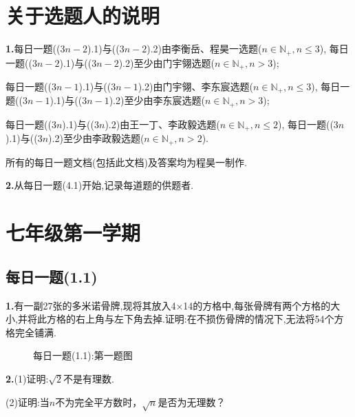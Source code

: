 \documentclass{article}
\title{\vspace*{-1em}{\huge\textbf{每日一题合集}}}
\author{\kaishu李衡岳、\textbf{程昊一}、门宇翎、李东宸、王一丁、李政毅}
\date{}
\begin{document}
\maketitle

{\centering\tableofcontents}
\newpage\section{关于选题人的说明}
\textbf{1.}每日一题(($3n-2$).1)与(($3n-2$).2)由李衡岳、程昊一选题($n\in\mathbb{N}_+, n\le3$), 每日一题(($3n-2$).1)与(($3n-2$).2)至少由门宇翎选题($n\in\mathbb{N}_+, n>3$);
\par\hspace*{1em}每日一题(($3n-1$).1)与(($3n-1$).2)由门宇翎、李东宸选题($n\in\mathbb{N}_+, n\le3$), 每日一题(($3n-1$).1)与(($3n-1$).2)至少由李东宸选题($n\in\mathbb{N}_+, n>3$);
\par\hspace*{1em}每日一题(($3n$).1)与(($3n$).2)由王一丁、李政毅选题($n\in\mathbb{N_+}, n\le 2$), 每日一题(($3n$).1)与(($3n$).2)至少由李政毅选题($n\in\mathbb{N_+}, n>2$).
\par\hspace*{1em}所有的每日一题文档(包括此文档)及答案均为程昊一制作.\\
\par\textbf{2.}从每日一题(4.1)开始,记录每道题的供题者.
\newpage\section{七年级第一学期}

{\centering\subsection*{每日一题(1.1)}}
\par\textbf{1.}有一副27张的多米诺骨牌,现将其放入4$\times$14的方格中,每张骨牌有两个方格的大小,并将此方格的右上角与左下角去掉.证明:在不损伤骨牌的情况下,无法将54个方格完全铺满.\\
\begin{figure}[H]%
	\centering
	\caption{每日一题(1.1):第一题图}
\end{figure}
\par\textbf{2.}(1)证明:$\sqrt{2}$不是有理数.
\par\hspace*{3.5mm}(2)证明:当$n$不为完全平方数时，$\sqrt{n}$是否为无理数？\\
\end{document}
